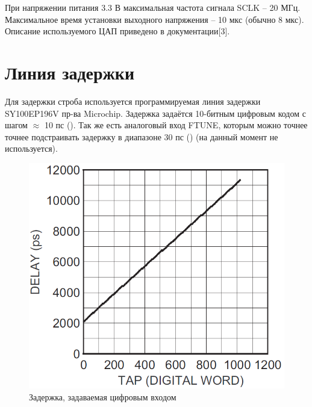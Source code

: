 При напряжении питания 3.3 В максимальная частота сигнала SCLK -- 20 МГц. Максимальное время установки
выходного напряжения -- 10 мкс (обычно 8 мкс). Описание используемого ЦАП приведено в документации[3].

\section{Линия задержки}

Для задержки строба используется программируемая линия задержки SY100EP196V пр-ва Microchip.
Задержка задаётся 10-битным цифровым кодом с шагом $ \approx $ 10 пс ().
Так же есть аналоговый вход FTUNE, которым можно точнее точнее подстраивать
задержку в диапазоне 30 пс () (на данный момент не используется).

\FloatBarrier

\begin{figure}[ht!] 
	\center
	\includegraphics [scale=0.6] {my_folder/images//dline_code}
	\caption{Задержка, задаваемая цифровым входом} 
	\label{fig:dline-code}  
\end{figure}

